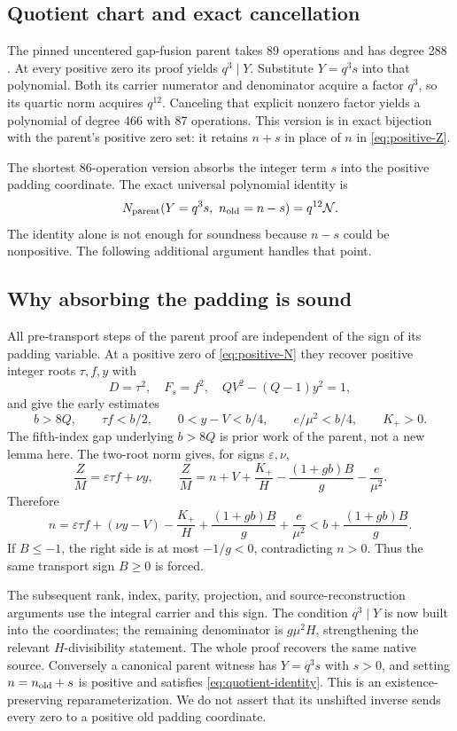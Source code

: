 \documentclass[11pt,letterpaper]{article}
\theoremstyle{remark}\newtheorem{remark}[theorem]{Remark}
\begin{document}
\subsection{Quotient chart and exact cancellation}

The pinned uncentered gap-fusion parent takes 89 operations and has degree
288 \cite{gapfusion}.  At every positive zero its proof yields $q^3\mid Y$.
Substitute $Y=q^3s$ into that polynomial.  Both its carrier numerator and
denominator acquire a factor $q^3$, so its quartic norm acquires $q^{12}$.
Canceling that explicit nonzero factor yields a polynomial of degree 466
with 87 operations.  This version is in exact bijection with the parent's
positive zero set: it retains $n+s$ in place of $n$ in
\eqref{eq:positive-Z}.

The shortest 86-operation version absorbs the integer term $s$ into the
positive padding coordinate.  The exact universal polynomial identity is
\begin{equation}\label{eq:quotient-identity}
 N_{\rm parent}(Y=q^3s,\ n_{\rm old}=n-s)
       =q^{12}\mathcal N.
\end{equation}
The identity alone is not enough for soundness because $n-s$ could be
nonpositive.  The following additional argument handles that point.

\subsection{Why absorbing the padding is sound}

All pre-transport steps of the parent proof are independent of the sign
of its padding variable.  At a positive zero of \eqref{eq:positive-N}
they recover positive integer roots $\tau,f,y$ with
\[
 D=\tau^2,\quad F_s=f^2,\quad
 QV^2-(Q-1)y^2=1,
\]
and give the early estimates
\[
 b>8Q,\qquad \tau f<b/2,\qquad 0<y-V<b/4,
 \qquad e/\mu^2<b/4,\qquad K_+>0.
\]
The fifth-index gap underlying $b>8Q$ is prior work of the parent, not a
new lemma here.  The two-root norm gives, for signs $\varepsilon,\nu$,
\[
 \frac ZM=\varepsilon\tau f+\nu y,
 \qquad
 \frac ZM=n+V+\frac{K_+}{H}
       -\frac{(1+gb)B}{g}-\frac e{\mu^2}.
\]
Therefore
\[
 n=\varepsilon\tau f+(\nu y-V)-\frac{K_+}{H}
       +\frac{(1+gb)B}{g}+\frac e{\mu^2}
   <b+\frac{(1+gb)B}{g}.
\]
If $B\le-1$, the right side is at most $-1/g<0$, contradicting
$n>0$.  Thus the same transport sign $B\ge0$ is forced.

The subsequent rank, index, parity, projection, and source-reconstruction
arguments use the integral carrier and this sign.  The condition $q^3\mid Y$
is now built into the coordinates; the remaining denominator is
$g\mu^2H$, strengthening the relevant $H$-divisibility statement.  The
whole proof recovers the same native source.  Conversely a canonical
parent witness has $Y=q^3s$ with $s>0$, and setting
$n=n_{\rm old}+s$ is positive and satisfies \eqref{eq:quotient-identity}.
This is an existence-preserving reparameterization.  We do not assert
that its unshifted inverse sends every zero to a positive old padding
coordinate.
\end{document}
